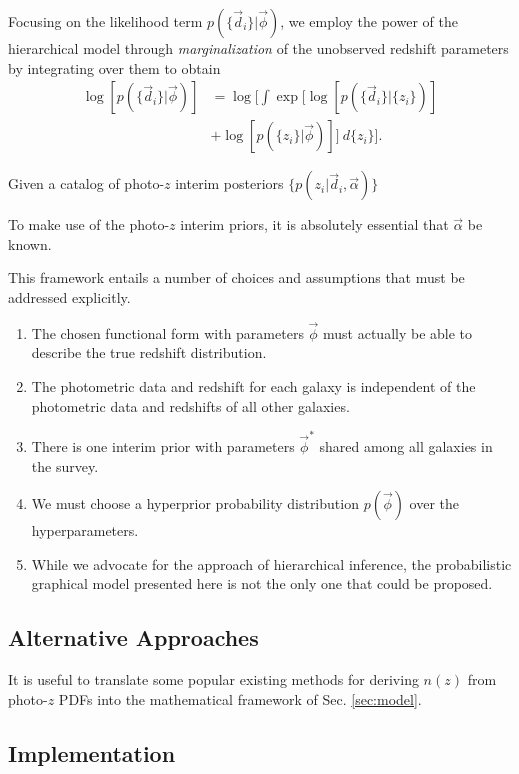 \documentclass[iop]{emulateapj}
\begin{document}
Focusing on the likelihood term $p(\{\vec{d}_{i}\} | \vec{\phi})$, we employ 
the power of the hierarchical model through \textit{marginalization} of the 
unobserved redshift parameters by integrating over them to obtain 
\begin{align}
\log[p(\{\vec{d}_{i}\} | \vec{\phi})] &= \log[\int\exp[\log[p(\{\vec{d}_{i}\} | 
\{z_{i}\})]\\
& + \log[p(\{z_{i}\} | \vec{\phi})]]\ d\{z_{i}\}].
\end{align}


Given a catalog of photo-$z$ interim posteriors $\{p(z_{i} | \vec{d}_{i}, 
\vec{\alpha})\}$

To make use of the photo-$z$ interim priors, it is absolutely essential that 
$\vec{\alpha}$ be known.  

This framework entails a number of choices and assumptions that must be 
addressed explicitly.

\begin{enumerate}
	\item The chosen functional form with parameters $\vec{\phi}$ must 
actually be able to describe the true redshift distribution.
	\item The photometric data and redshift for each galaxy is independent 
of the photometric data and redshifts of all other galaxies.
	\item There is one interim prior with parameters $\vec{\phi}^{*}$ 
shared among all galaxies in the survey.
	\item We must choose a hyperprior probability distribution 
$p(\vec{\phi})$ over the hyperparameters.
	\item While we advocate for the approach of hierarchical inference, the 
probabilistic graphical model presented here is not the only one that could be 
proposed.
\end{enumerate}

\subsection{Alternative Approaches}
\label{sec:others}

It is useful to translate some popular existing methods for deriving $n(z)$ 
from photo-$z$ PDFs into the mathematical framework of Sec. \ref{sec:model}.

\subsection{Implementation}
\label{sec:implementation}
\end{document}
